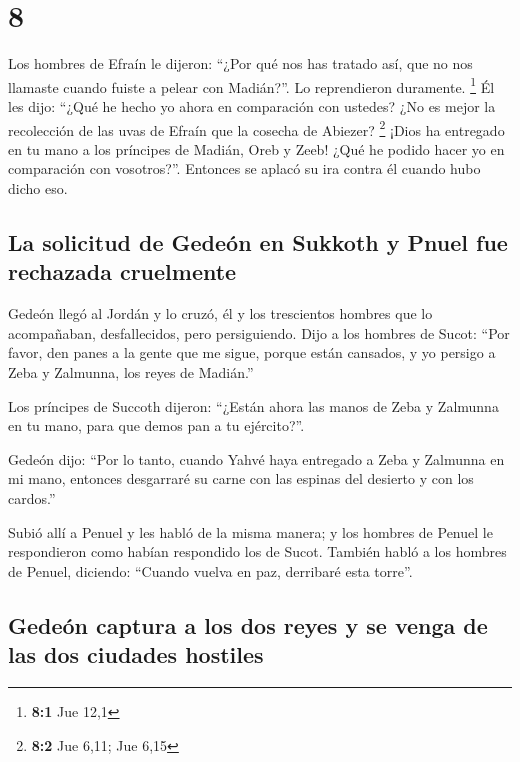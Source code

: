 \hypertarget{section-7}{%
\section{8}\label{section-7}}

 Los hombres de Efraín le dijeron: ``¿Por qué nos has
tratado así, que no nos llamaste cuando fuiste a pelear con Madián?''.
Lo reprendieron duramente. \footnote{\textbf{8:1} Jue 12,1}
 Él les dijo: ``¿Qué he hecho yo ahora en comparación con
ustedes? ¿No es mejor la recolección de las uvas de Efraín que la
cosecha de Abiezer? \footnote{\textbf{8:2} Jue 6,11; Jue 6,15}
 ¡Dios ha entregado en tu mano a los príncipes de Madián,
Oreb y Zeeb! ¿Qué he podido hacer yo en comparación con vosotros?''.
Entonces se aplacó su ira contra él cuando hubo dicho eso.

\hypertarget{la-solicitud-de-gedeuxf3n-en-sukkoth-y-pnuel-fue-rechazada-cruelmente}{%
\subsection{La solicitud de Gedeón en Sukkoth y Pnuel fue rechazada
cruelmente}\label{la-solicitud-de-gedeuxf3n-en-sukkoth-y-pnuel-fue-rechazada-cruelmente}}

 Gedeón llegó al Jordán y lo cruzó, él y los trescientos
hombres que lo acompañaban, desfallecidos, pero persiguiendo.
 Dijo a los hombres de Sucot: ``Por favor, den panes a la
gente que me sigue, porque están cansados, y yo persigo a Zeba y
Zalmunna, los reyes de Madián.''

 Los príncipes de Succoth dijeron: ``¿Están ahora las
manos de Zeba y Zalmunna en tu mano, para que demos pan a tu
ejército?''.

 Gedeón dijo: ``Por lo tanto, cuando Yahvé haya entregado
a Zeba y Zalmunna en mi mano, entonces desgarraré su carne con las
espinas del desierto y con los cardos.''

 Subió allí a Penuel y les habló de la misma manera; y los
hombres de Penuel le respondieron como habían respondido los de Sucot.
 También habló a los hombres de Penuel, diciendo: ``Cuando
vuelva en paz, derribaré esta torre''.

\hypertarget{gedeuxf3n-captura-a-los-dos-reyes-y-se-venga-de-las-dos-ciudades-hostiles}{%
\subsection{Gedeón captura a los dos reyes y se venga de las dos
ciudades
hostiles}\label{gedeuxf3n-captura-a-los-dos-reyes-y-se-venga-de-las-dos-ciudades-hostiles}}

